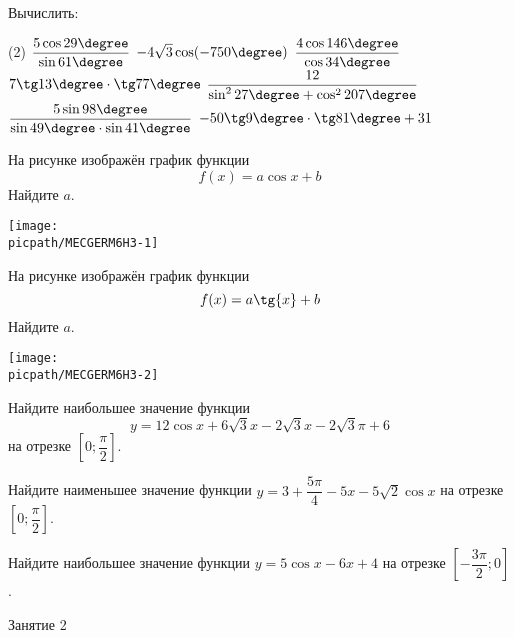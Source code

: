 \begin{class}[number=1]
\begin{listofex}
		\item Вычислить: 
		\begin{tasks}(2)
			\task \( \dfrac{5\cos29\degree}{\sin61\degree} \)
			\task \( -4\sqrt{3}\cos(-750\degree) \)
			\task \( \dfrac{4\cos146\degree}{\cos34\degree} \)
			\task \( 7\tg13\degree\cdot\tg77\degree \)
			\task \( \dfrac{12}{\sin^227\degree+\cos^2207\degree} \)
			\task \( \dfrac{5\sin98\degree}{\sin49\degree\cdot\sin41\degree} \)
			\task \( -50\tg9\degree\cdot\tg81\degree+31 \)
		\end{tasks}
		\item
		\begin{minipage}[t]{\bodywidth}
			На рисунке изображён график функции \[ f(x)=a \cos{x}+b \] Найдите \(a\).
		\end{minipage}
		\hspace{0.02\linewidth}
		\begin{minipage}[t]{\picwidth}
			\texttt{[image: \\picpath/MECGERM6H3-1]}
		\end{minipage}
		\item
		\begin{minipage}[t]{\bodywidth}
			На рисунке изображён график функции \[ f(x)=a \tg{x}+b \] Найдите \(a\).
		\end{minipage}
		\hspace{0.02\linewidth}
		\begin{minipage}[t]{\picwidth}
			\texttt{[image: \\picpath/MECGERM6H3-2]}
		\end{minipage}
		\item Найдите наибольшее значение функции \[ y=12\cos x + 6\sqrt{3}x - 2 \sqrt{3}x - 2 \sqrt{3} \pi + 6\] на отрезке \( \left[ 0; \dfrac{ \pi }{ 2 } \right]  \).
		\item Найдите наименьшее значение функции \( y=3+\dfrac{ 5\pi }{ 4 }-5x-5\sqrt{2} \cos x\) на отрезке \( \left[ 0; \dfrac{ \pi }{ 2 } \right]  \).
		\item Найдите наибольшее значение функции \( y=5 \cos x - 6x + 4 \) на отрезке \( \left[ -\dfrac{ 3\pi }{ 2 }; 0 \right]  \).
	\end{listofex}
\end{class}

\begin{class}[number=2]
	\begin{listofex}
		\item Занятие 2
	\end{listofex}
\end{class}

